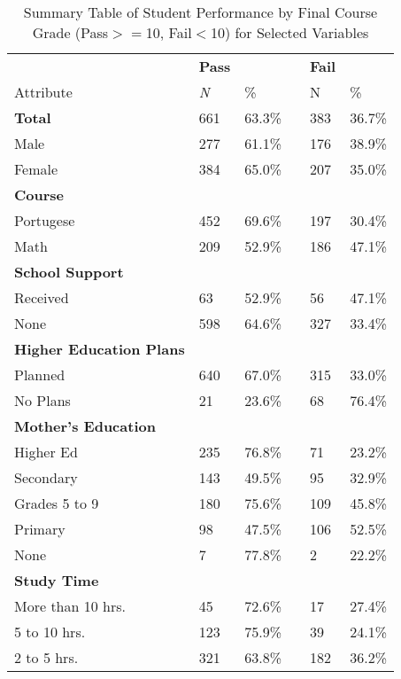 \documentclass[sigconf]{acmart}
\begin{document}
 
\begin{table}
  \caption{Summary Table of Student Performance by Final Course Grade 
  (Pass$>=$10, Fail$<$10) for Selected Variables}
  \label{tab:freq}
  \begin{tabular}{llllll}
    \toprule
                    &  \textbf{Pass} & & & \textbf{Fail} & \\
    Attribute & \textit{N} & \% &  & N & \% \\
    \midrule
    \textbf{Total}  & 661 & 63.3\% & & 383 & 36.7\% \\
    \midrule
    Male            & 277 & 61.1\% & & 176 & 38.9\%  \\
    Female          & 384 & 65.0\% & & 207 & 35.0\%  \\
    \midrule
    \textbf{Course} &  &  &  &  & \\
    Portugese       & 452 & 69.6\% & & 197 & 30.4\%  \\
    Math            & 209 & 52.9\% & & 186 & 47.1\%  \\  
    \midrule
    \textbf{School Support} &  &  &  &  & \\
    Received        &  63 & 52.9\% & &  56 & 47.1\%  \\
    None            & 598 & 64.6\% & & 327 & 33.4\%  \\ 
    \midrule    
    \textbf{Higher Education Plans} &  &  &  &  & \\
    Planned         & 640 & 67.0\% & & 315 & 33.0\%  \\
    No Plans        &  21 & 23.6\% & &  68 & 76.4\%  \\
    \midrule
    \textbf{Mother's Education} &  &  &  &  & \\
    Higher Ed       & 235 & 76.8\% & &  71 & 23.2\% \\
    Secondary       & 143 & 49.5\% & &  95 & 32.9\% \\
    Grades 5 to 9   & 180 & 75.6\% & & 109 & 45.8\% \\
    Primary         &  98 & 47.5\% & & 106 & 52.5\% \\
    None            &   7 & 77.8\% & &   2 & 22.2\% \\
    \midrule    
    \textbf{Study Time} &   &  &  &  &     \\
    More than 10 hrs. &  45 & 72.6\% & &  17 & 27.4\% \\
    5 to 10 hrs.      & 123 & 75.9\% & &  39 & 24.1\% \\
    2 to 5 hrs.       & 321 & 63.8\% & & 182 & 36.2\% \\    

\end{tabular}
\end{table}
\end{document}
